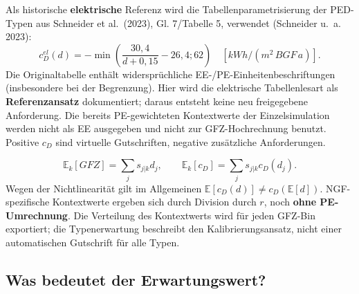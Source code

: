 \documentclass[
  ngerman,
  a4paper,
  DIV=11]{scrreprt}
\begin{document}
Als historische \textbf{elektrische} Referenz wird die
Tabellenparametrisierung der PED-Typen aus Schneider et al.~(2023), Gl.
7/Tabelle 5, verwendet (Schneider u.~a. 2023):
\[c_D^{el}(d)=-\min\left(\frac{30{,}4}{d+0{,}15}-26{,}4;62\right)\quad[kWh/(m^2\,BGF\,a)].\]
Die Originaltabelle enthält widersprüchliche
EE-/PE-Einheitenbeschriftungen (insbesondere bei der Begrenzung). Hier
wird die elektrische Tabellenlesart als \textbf{Referenzansatz}
dokumentiert; daraus entsteht keine neu freigegebene Anforderung. Die
bereits PE-gewichteten Kontextwerte der Einzelsimulation werden nicht
als EE ausgegeben und nicht zur GFZ-Hochrechnung benutzt. Positive
\(c_D\) sind virtuelle Gutschriften, negative zusätzliche Anforderungen.

\[\mathbb E_k[GFZ]=\sum_j s_{j|k}d_j,\qquad\mathbb E_k[c_D]=\sum_j s_{j|k}c_D(d_j).\]
Wegen der Nichtlinearität gilt im Allgemeinen
\(\mathbb E[c_D(d)]\ne c_D(\mathbb E[d])\). NGF-spezifische Kontextwerte
ergeben sich durch Division durch \(r\), noch \textbf{ohne
PE-Umrechnung}. Die Verteilung des Kontextwerts wird für jeden GFZ-Bin
exportiert; die Typenerwartung beschreibt den Kalibrierungsansatz, nicht
einer automatischen Gutschrift für alle Typen.

\subsection{Was bedeutet der
Erwartungswert?}\label{was-bedeutet-der-erwartungswert}
\end{document}
